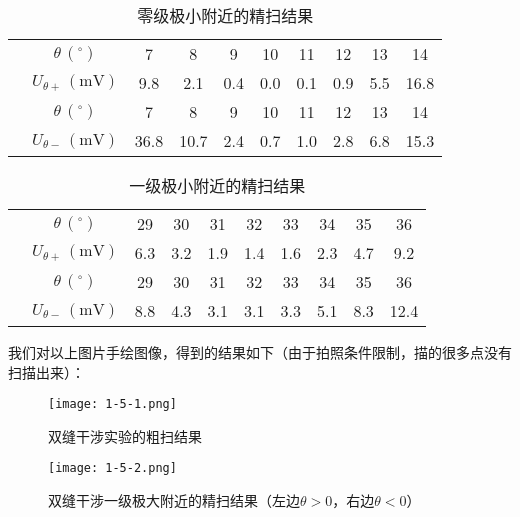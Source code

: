 \documentclass[12pt]{article}
\begin{document}
\newpage

\begin{table}[htbp]
    \centering
    \begin{tabular}{|c|c|c|c|c|c|c|c|c|c|}
    \hline
     & $\theta\,(^\circ)$            & 7    & 8    & 9   & 10  & 11  & 12  & 13  & 14   \\  
                          & $U_{\theta +}\,(\mathrm{mV})$ & 9.8  & 2.1  & 0.4 & 0.0 & 0.1 & 0.9 & 5.5 & 16.8 \\  
                          & $\theta\,(^\circ)$            & 7    & 8    & 9   & 10  & 11  & 12  & 13  & 14   \\  
                          & $U_{\theta -}\,(\mathrm{mV})$ & 36.8 & 10.7 & 2.4 & 0.7 & 1.0 & 2.8 & 6.8 & 15.3 \\ \hline
    \end{tabular}
    \caption{零级极小附近的精扫结果}
\end{table}

\begin{table}[htbp]
    \centering
    \begin{tabular}{|c|c|c|c|c|c|c|c|c|c|}
    \hline
     & $\theta\,(^\circ)$            & 29  & 30  & 31  & 32  & 33  & 34  & 35  & 36   \\  
                          & $U_{\theta +}\,(\mathrm{mV})$ & 6.3 & 3.2 & 1.9 & 1.4 & 1.6 & 2.3 & 4.7 & 9.2  \\  
                          & $\theta\,(^\circ)$            & 29  & 30  & 31  & 32  & 33  & 34  & 35  & 36   \\  
                          & $U_{\theta -}\,(\mathrm{mV})$ & 8.8 & 4.3 & 3.1 & 3.1 & 3.3 & 5.1 & 8.3 & 12.4 \\ \hline
    \end{tabular}
    \caption{一级极小附近的精扫结果}
\end{table}

我们对以上图片手绘图像，得到的结果如下（由于拍照条件限制，描的很多点没有扫描出来）：

\begin{figure}[h!]
    \centering
    \texttt{[image: 1-5-1.png]}
    \caption{双缝干涉实验的粗扫结果}
\end{figure}

\begin{figure}[h!]
    \centering
    \texttt{[image: 1-5-2.png]}
    \caption{双缝干涉一级极大附近的精扫结果（左边$\theta>0$，右边$\theta<0$）}
\end{figure}
\end{document}
